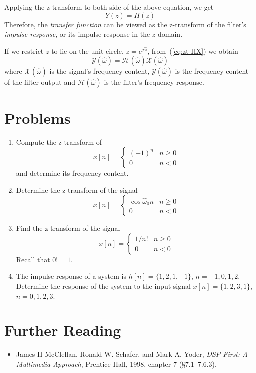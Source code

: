 Applying the z-transform to both side of the above equation, we get
\begin{equation}
Y(z)= H(z)
\end{equation}
Therefore, the \emph{transfer function} can be viewed as the
z-transform of the filter's \emph{impulse response}, or its impulse
response in the $z$ domain.

If we restrict $z$ to lie on the unit circle, $z=e^{j\hat{\omega}}$,
from~(\ref{eq:zt-HX}) we obtain
\begin{equation}
\mathcal{Y}(\hat{\omega})=\mathcal{H}(\hat{\omega})\mathcal{X}(\hat{\omega})
\end{equation} 
where $\mathcal{X}(\hat{\omega})$ is the signal's frequency content,
$\mathcal{Y}(\hat{\omega})$ is the frequency content of the filter
output and $\mathcal{H}(\hat{\omega})$ is the filter's frequency
response.


\section{Problems}

\begin{enumerate}
\item Compute the z-transform of 
\begin{equation}
x[n] = \left\{\begin{array}{ll}
                        (-1)^n & n \ge 0 \\
                        0 & n < 0
          \end{array}\right.
\end{equation}
and determine its frequency content. 

\item Determine the z-transform of the signal 
\begin{equation}
x[n] = \left\{\begin{array}{ll}
                        \cos\hat{\omega}_0 n & n \ge 0 \\
                        0 & n < 0
          \end{array}\right.
\end{equation}

\item Find the z-transform of the signal
\[x[n] = \left\{\begin{array}{ll} 1/n! & n \geq 0 \\
                0 & n < 0 \end{array} \right. \]
Recall that $0!=1$.

\item The impulse response of a system is $h[n]=\{1,2,1,-1\}$, $n=-1,
0,1,2$. Determine the response of the system to the input signal
$x[n]=\{1,2,3,1\}$, $n=0, 1,2,3$.

\end{enumerate}


\section{Further Reading}

\begin{itemize}
\item James H McClellan, Ronald W. Schafer, and Mark A. Yoder,
  \textit{DSP First: A Multimedia Approach}, Prentice Hall, 1998,
  chapter 7 (\S 7.1--7.6.3).
\end{itemize}

